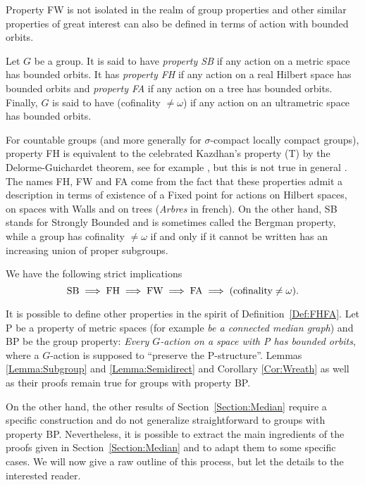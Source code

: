 Property FW is not isolated in the realm of group properties and other similar properties of great interest can also be defined in terms of action with bounded orbits.
\begin{defn}\label{Def:FHFA}
Let $G$ be a group.
It is said to have \emph{property SB} if any action on a metric space has bounded orbits.
It has \emph{property FH} if any action on a real Hilbert space has bounded orbits and \emph{property FA} if any action on a tree has bounded orbits.
Finally, $G$ is said to have (cofinality $\neq\omega$) if any action on an ultrametric space has bounded orbits.
\end{defn}
For countable groups (and more generally for $\sigma$-compact locally compact groups), property FH is equivalent to the celebrated Kazdhan's property (T) by the Delorme-Guichardet theorem, see for example \cite{MR2415834}, but this is not true in general \cite{MR2240370}.
The names FH, FW and FA come from the fact that these properties admit a description in terms of existence of a Fixed point for actions on Hilbert spaces, on spaces with Walls and on trees (\emph{Arbres} in french).
On the other hand, SB stands for Strongly Bounded and is sometimes called the Bergman property, while a group has cofinality $\neq\omega$ if and only if it cannot be written has an increasing union of proper subgroups.

We have the following strict implications \cite{MR1432323,MR0476875 ,MR3299841,2013arXiv1302.5982C}
\[
\textnormal{SB}\implies \textnormal{FH}\implies \textnormal{FW}\implies \textnormal{FA}\implies(\textnormal{cofinality}\neq\omega).
\]

It is possible to define other properties in the spirit of Definition~\ref{Def:FHFA}.
Let P be a property of metric spaces (for example \emph{be a connected median graph}) and BP be the group property: \emph{Every $G$-action on a space with P has bounded orbits}, where a $G$-action is supposed to ``preserve the P-structure''.
Lemmas \ref{Lemma:Subgroup} and \ref{Lemma:Semidirect} and Corollary \ref{Cor:Wreath} as well as their proofs remain true for groups with property BP.

On the other hand, the other results of Section~\ref{Section:Median} require a specific construction and do not generalize straightforward to groups with property BP.
Nevertheless, it is possible to extract the main ingredients of the proofs given in Section~\ref{Section:Median} and to adapt them to some specific cases.
We will now give a raw outline of this process, but let the details to the interested reader.

